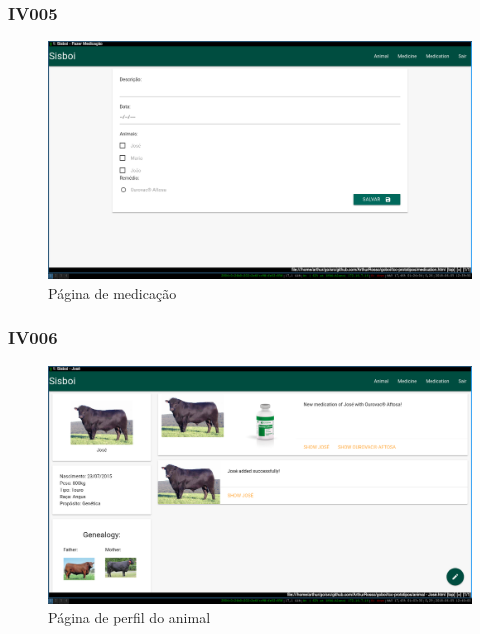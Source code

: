 \documentclass[12pt]{article}
\begin{document}
\begin{titlepage}
\begin{figure}[!h]
\begin{center}

\end{center}
\end{figure}

\newpage

\subsubsection{IV005}

\begin{figure}[!h]
\begin{center}
\caption{Página de medicação}
\includegraphics[width=13cm]{img/prototipos/medicacao.png}


\end{center}
\end{figure}


\subsubsection{IV006}

\begin{figure}[!h]
\begin{center}
\caption{Página de perfil do animal}
\includegraphics[width=13cm]{img/prototipos/perfil.png}


\end{center}
\end{figure}
\end{titlepage}
\end{document}
